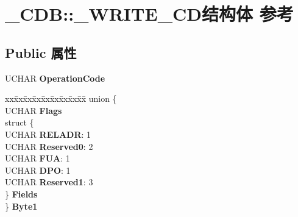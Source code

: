 \hypertarget{struct___c_d_b_1_1___w_r_i_t_e___c_d}{}\section{\+\_\+\+C\+DB\+:\+:\+\_\+\+W\+R\+I\+T\+E\+\_\+\+C\+D结构体 参考}
\label{struct___c_d_b_1_1___w_r_i_t_e___c_d}
\subsection*{Public 属性}
\begin{DoxyCompactItemize}
\item 
\mbox{\label{struct___c_d_b_1_1___w_r_i_t_e___c_d_adeb5027fefb0004939891d7f11ed8ce9}} 
U\+C\+H\+AR {\bfseries Operation\+Code}
\item 
\mbox{\label{struct___c_d_b_1_1___w_r_i_t_e___c_d_a749d5688d7e99450485ddc93033373fb}} 
\begin{tabbing}
xx\=xx\=xx\=xx\=xx\=xx\=xx\=xx\=xx\=\kill
union \{\\
\>UCHAR {\bfseries Flags}\\
\>struct \{\\
\>\>UCHAR {\bfseries RELADR}: 1\\
\>\>UCHAR {\bfseries Reserved0}: 2\\
\>\>UCHAR {\bfseries FUA}: 1\\
\>\>UCHAR {\bfseries DPO}: 1\\
\>\>UCHAR {\bfseries Reserved1}: 3\\
\>\} {\bfseries Fields}\\
\} {\bfseries Byte1}\\


\end{tabbing}
\end{DoxyCompactItemize}
